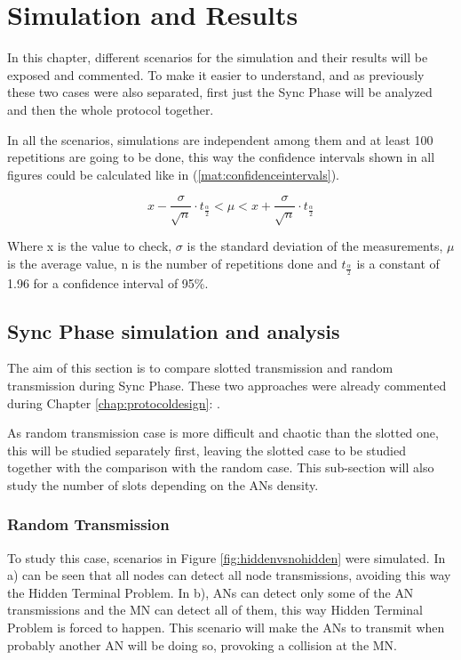 \chapter{Simulation and Results}
\label{chap:simulationandresults}

In this chapter, different scenarios for the simulation and their results will be exposed and commented. To make it easier to understand, and as 
previously these two cases were also separated, first just the Sync Phase will be analyzed and then the whole protocol together.

In all the scenarios, simulations are independent among them and at least 100 repetitions are going to be done, this way the confidence intervals
shown in all figures could be calculated like in (\ref{mat:confidenceintervals}).

\begin{equation}
  x-\frac{\sigma}{\sqrt{n}}\cdot t_{\frac{\alpha}{2}} < \mu < x+\frac{\sigma}{\sqrt{n}}\cdot t_{\frac{\alpha}{2}}
  \label{mat:confidenceintervals}
\end{equation}

Where x is the value to check, $\sigma$ is the standard deviation of the measurements, $\mu$ is the average value, n is the number of repetitions done and 
$t_{\frac{\alpha}{2}}$ is a constant of 1.96 for a confidence interval of 95\%.

\section{Sync Phase simulation and analysis}

The aim of this section is to compare slotted transmission and random transmission during Sync Phase. These two approaches were already commented 
during Chapter \ref{chap:protocoldesign}: .

As random transmission case is more difficult and chaotic than the slotted one, this will be studied separately first, leaving the slotted case 
to be studied together with the comparison with the random case. This sub-section will also study the number of slots depending on the \acp{AN} 
density.

\subsection{Random Transmission}

To study this case, scenarios in Figure \ref{fig:hiddenvsnohidden} were simulated. In a) can be seen that all nodes can detect all node 
transmissions, avoiding this way the Hidden Terminal Problem. In b), \acp{AN} can detect only some of the \ac{AN} transmissions and the 
\ac{MN} can detect all of them, this way Hidden Terminal Problem is forced to happen. This scenario will make the \acp{AN} to transmit when 
probably another \ac{AN} will be doing so, provoking a collision at the \ac{MN}.

